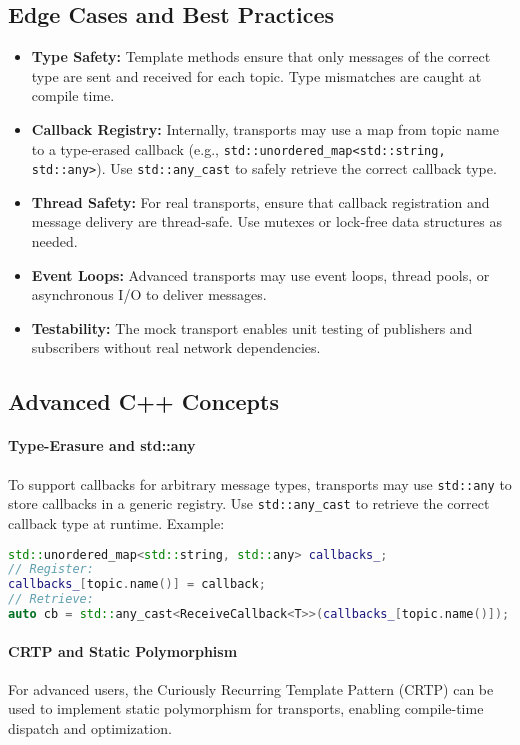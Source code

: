 \documentclass[12pt]{report}
\begin{document}
\subsection{Edge Cases and Best Practices}
\begin{itemize}
    \item \textbf{Type Safety:} Template methods ensure that only messages of the correct type are sent and received for each topic. Type mismatches are caught at compile time.
    \item \textbf{Callback Registry:} Internally, transports may use a map from topic name to a type-erased callback (e.g., \texttt{std::unordered\_map<std::string, std::any>}). Use \texttt{std::any\_cast} to safely retrieve the correct callback type.
    \item \textbf{Thread Safety:} For real transports, ensure that callback registration and message delivery are thread-safe. Use mutexes or lock-free data structures as needed.
    \item \textbf{Event Loops:} Advanced transports may use event loops, thread pools, or asynchronous I/O to deliver messages.
    \item \textbf{Testability:} The mock transport enables unit testing of publishers and subscribers without real network dependencies.
\end{itemize}

\subsection{Advanced C++ Concepts}
\paragraph{Type-Erasure and std::any}
To support callbacks for arbitrary message types, transports may use \texttt{std::any} to store callbacks in a generic registry. Use \texttt{std::any\_cast} to retrieve the correct callback type at runtime. Example:
\begin{lstlisting}[language=C++]
std::unordered_map<std::string, std::any> callbacks_;
// Register:
callbacks_[topic.name()] = callback;
// Retrieve:
auto cb = std::any_cast<ReceiveCallback<T>>(callbacks_[topic.name()]);
\end{lstlisting}

\paragraph{CRTP and Static Polymorphism}
For advanced users, the Curiously Recurring Template Pattern (CRTP) can be used to implement static polymorphism for transports, enabling compile-time dispatch and optimization.
\end{document}
